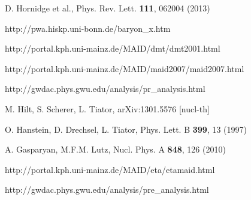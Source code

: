 \documentclass[a4paper,10pt]{article}
\def\tt{\ttfamily}
\def\rm{\rmfamily}
\begin{document}
\begin{thebibliography}{00}



D. Hornidge et al.,
Phys. Rev. Lett. \textbf{111}, 062004 (2013)

\tt http://pwa.hiskp.uni-bonn.de/baryon\_x.htm\rm

\tt http://portal.kph.uni-mainz.de/MAID/dmt/dmt2001.html\rm

\tt http://portal.kph.uni-mainz.de/MAID/maid2007/maid2007.html\rm

\tt http://gwdac.phys.gwu.edu/analysis/pr\_analysis.html\rm

M. Hilt, S. Scherer, L. Tiator,
arXiv:1301.5576 [nucl-th]

O. Hanstein, D. Drechsel, L. Tiator,
Phys. Lett. B \textbf{399}, 13 (1997)

A. Gasparyan, M.F.M. Lutz,
Nucl. Phys. A \textbf{848}, 126 (2010)

\tt http://portal.kph.uni-mainz.de/MAID/eta/etamaid.html\rm

\tt http://gwdac.phys.gwu.edu/analysis/pre\_analysis.html\rm

\end{thebibliography}
\end{document}
